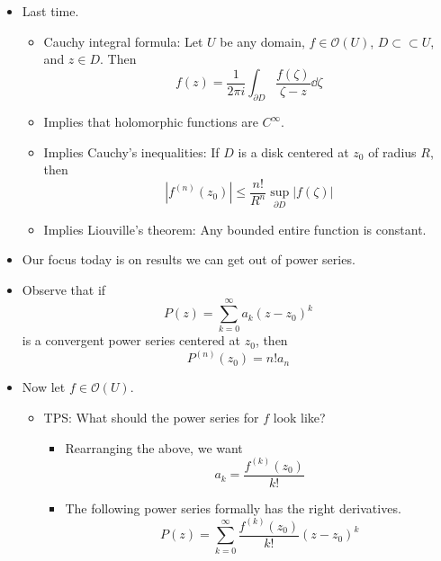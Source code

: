 \documentclass[../notes.tex]{subfiles}
\begin{document}
\begin{itemize}
    \item {}Last time.
    \begin{itemize}
        \item Cauchy integral formula: Let $U$ be any domain, $f\in\mathcal{O}(U)$, $D\subset\subset U$, and $z\in D$. Then
        \begin{equation*}
            f(z) = \frac{1}{2\pi i}\int_{\partial D}\frac{f(\zeta)}{\zeta-z}\dd\zeta
        \end{equation*}
        \item Implies that holomorphic functions are $C^\infty$.
        \item Implies Cauchy's inequalities: If $D$ is a disk centered at $z_0$ of radius $R$, then
        \begin{equation*}
            |f^{(n)}(z_0)| \leq \frac{n!}{R^n}\sup_{\partial D}|f(\zeta)|
        \end{equation*}
        \item Implies Liouville's theorem: Any bounded entire function is constant.
    \end{itemize}
    \item Our focus today is on results we can get out of power series.
    \item Observe that if
    \begin{equation*}
        P(z) = \sum_{k=0}^\infty a_k(z-z_0)^k
    \end{equation*}
    is a convergent power series centered at $z_0$, then
    \begin{equation*}
        P^{(n)}(z_0) = n!a_n
    \end{equation*}
    \item Now let $f\in\mathcal{O}(U)$.
    \begin{itemize}
        \item TPS: What should the power series for $f$ look like?
        \begin{itemize}
            \item Rearranging the above, we want
            \begin{equation*}
                a_k = \frac{f^{(k)}(z_0)}{k!}
            \end{equation*}
            \item The following power series formally has the right derivatives.
            \begin{equation*}
                P(z) = \sum_{k=0}^\infty\frac{f^{(k)}(z_0)}{k!}(z-z_0)^k

\end{equation*}
\end{itemize}
\end{itemize}
\end{itemize}
\end{document}
